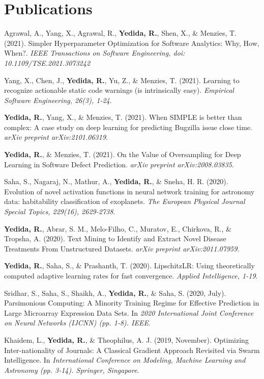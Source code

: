 \section{Publications}
 \resumeSubHeadingListStart
    \item
      {Agrawal, A., Yang, X., Agrawal, R., \textbf{Yedida, R.}, Shen, X., \& Menzies, T. (2021). Simpler Hyperparameter Optimization for Software Analytics: Why, How, When?. \textit{IEEE Transactions on Software Engineering, doi: 10.1109/TSE.2021.3073242}}
    \item
      {Yang, X., Chen, J., \textbf{Yedida, R.}, Yu, Z., \& Menzies, T. (2021). Learning to recognize actionable static code warnings (is intrinsically easy). \textit{Empirical Software Engineering, 26(3), 1-24}.}
    \item
      {\textbf{Yedida, R.}, Yang, X., \& Menzies, T. (2021). When SIMPLE is better than complex: A case study on deep learning for predicting Bugzilla issue close time. \textit{arXiv preprint arXiv:2101.06319}.}
    \item
      {\textbf{Yedida, R.}, \& Menzies, T. (2021). On the Value of Oversampling for Deep Learning in Software Defect Prediction. \textit{arXiv preprint arXiv:2008.03835}.}
    \item
      {Saha, S., Nagaraj, N., Mathur, A., \textbf{Yedida, R.}, \& Sneha, H. R. (2020). Evolution of novel activation functions in neural network training for astronomy data: habitability classification of exoplanets. \textit{The European Physical Journal Special Topics, 229(16), 2629-2738}.}
    \item
      {\textbf{Yedida, R.}, Abrar, S. M., Melo-Filho, C., Muratov, E., Chirkova, R., \& Tropsha, A. (2020). Text Mining to Identify and Extract Novel Disease Treatments From Unstructured Datasets. \textit{arXiv preprint arXiv:2011.07959}.}
    \item
      {\textbf{Yedida, R.}, Saha, S., \& Prashanth, T. (2020). LipschitzLR: Using theoretically computed adaptive learning rates for fast convergence. \textit{Applied Intelligence, 1-19}.}
    \item
      {Sridhar, S., Saha, S., Shaikh, A., \textbf{Yedida, R.}, \& Saha, S. (2020, July). Parsimonious Computing: A Minority Training Regime for Effective Prediction in Large Microarray Expression Data Sets. In \textit{2020 International Joint Conference on Neural Networks (IJCNN) (pp. 1-8). IEEE}.}
    \item
      {Khaidem, L., \textbf{Yedida, R.}, \& Theophilus, A. J. (2019, November). Optimizing Inter-nationality of Journals: A Classical Gradient Approach Revisited via Swarm Intelligence. In \textit{International Conference on Modeling, Machine Learning and Astronomy (pp. 3-14). Springer, Singapore}.}
 \resumeSubHeadingListEnd